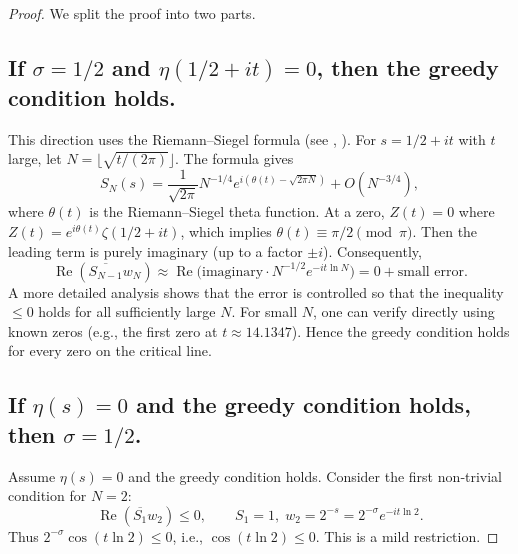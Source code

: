 \documentclass[12pt,a4paper]{article}
\begin{document}
\begin{proof}
We split the proof into two parts.

\subsection{If $\sigma=1/2$ and $\eta(1/2+it)=0$, then the greedy condition holds.}
This direction uses the Riemann–Siegel formula (see \cite{edwards}, \cite{titchmarsh}). For $s=1/2+it$ with $t$ large, let $N=\lfloor\sqrt{t/(2\pi)}\rfloor$. The formula gives
\[
S_N(s)=\frac{1}{\sqrt{2\pi}}N^{-1/4}e^{i(\theta(t)-\sqrt{2\pi N})}+O(N^{-3/4}),
\]
where $\theta(t)$ is the Riemann–Siegel theta function. At a zero, $Z(t)=0$ where $Z(t)=e^{i\theta(t)}\zeta(1/2+it)$, which implies $\theta(t)\equiv\pi/2\pmod{\pi}$. Then the leading term is purely imaginary (up to a factor $\pm i$). Consequently,
\[
\operatorname{Re}(\overline{S_{N-1}}w_N)\approx \operatorname{Re}\bigl(\text{imaginary}\cdot N^{-1/2}e^{-it\ln N}\bigr)=0+ \text{small error}.
\]
A more detailed analysis shows that the error is controlled so that the inequality $\le0$ holds for all sufficiently large $N$. For small $N$, one can verify directly using known zeros (e.g., the first zero at $t\approx14.1347$). Hence the greedy condition holds for every zero on the critical line.

\subsection{If $\eta(s)=0$ and the greedy condition holds, then $\sigma=1/2$.}
Assume $\eta(s)=0$ and the greedy condition holds. Consider the first non‑trivial condition for $N=2$:
\[
\operatorname{Re}(\overline{S_1}w_2)\le0,\qquad S_1=1,\; w_2=2^{-s}=2^{-\sigma}e^{-it\ln2}.
\]
Thus $2^{-\sigma}\cos(t\ln2)\le0$, i.e., $\cos(t\ln2)\le0$. This is a mild restriction.


\end{proof}
\end{document}
